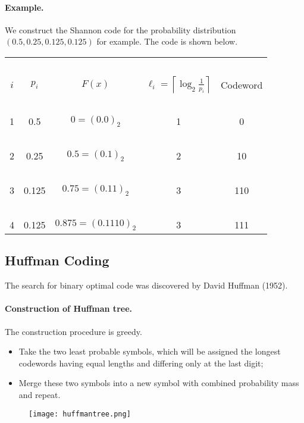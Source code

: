 \documentclass{article}
\numberwithin{equation}{section}
\theoremstyle{plain}
\theoremstyle{definition}
\begin{document}
\paragraph{Example.} We construct the Shannon code for the probability distribution $(0.5, 0.25, 0.125, 0.125)$ for example. The code is shown below.
	\begin{table}[H]
		\centering
		\begin{tabular}{c|c|c|c|c}
			\hline
			~ & ~ & ~ & ~ & ~\\[-2ex]
			$i$ & $p_i$ & $F(x)$ & $\ell_i=\left\lceil\log_2\frac{1}{p_i}\right\rceil$ & Codeword \\[1ex]
			\hline
			~ & ~ & ~ & ~ & ~\\[-2.5ex]
			1 & 0.5 & $0=(0.0)_2$ & 1 & 0 \\
			~ & ~ & ~ & ~ & ~\\[-2.5ex]
			2 & 0.25 & $0.5=(0.1)_2$ & 2 & 10 \\
			~ & ~ & ~ & ~ & ~\\[-2.5ex]
			3 & 0.125 & $0.75=(0.11)_2$ & 3 & 110\\
			~ & ~ & ~ & ~ & ~\\[-2.5ex]
			4 & 0.125 & $0.875=(0.1110)_2$ & 3 & 111\\
			\hline
		\end{tabular}\qquad
	\end{table}
\newpage
\subsection{Huffman Coding}
The search for binary optimal code was discovered by David Huffman (1952).
\paragraph{Construction of Huffman tree.} The construction procedure is greedy.
\begin{itemize}
	\item Take the two least probable symbols, which will be assigned the longest codewords having equal lengths and differing only at the last digit;
	\item Merge these two symbols into a new symbol with combined probability mass and repeat.
\end{itemize}

\begin{figure}[H]
	\texttt{[image: huffmantree.png]}
\end{figure}
\end{document}
